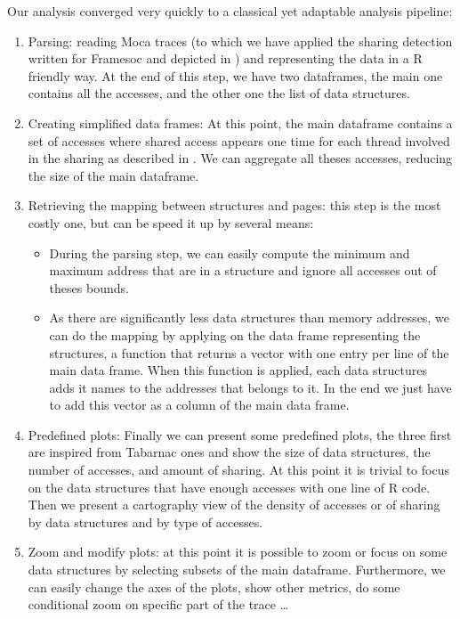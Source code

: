 Our analysis converged very quickly to a classical yet adaptable analysis pipeline:
\begin{enumerate}
    \item Parsing: reading \gls{Moca} traces (to which we have applied the sharing detection written for \gls{Framesoc} and depicted in )
        and representing the data in a \gls{R} friendly way.
        At the end of this step, we have two dataframes, the main one contains all the accesses, and the other one the list of data structures.
    \item Creating simplified data frames: At this point, the main dataframe contains a set of accesses where shared access appears one time for each thread involved in the sharing as described in .
        We can aggregate all theses accesses, reducing the size of the main dataframe.
    \item Retrieving the mapping between structures and pages: this step is the most costly one, but can be speed it up by several means:
        \begin{itemize}
            \item During the parsing step, we can easily compute the minimum and maximum address that are in a structure and ignore all accesses out of theses bounds.
            \item As there are significantly less data structures than memory addresses, we can do the mapping by applying on the data frame representing the structures, a function that returns a vector with one entry per line of the main data frame.
                When this function is applied, each data structures adds it names to the addresses that belongs to it.
                In the end we just have to add this vector as a column of the main data frame.
        \end{itemize}
    \item Predefined plots: Finally we can present some predefined  plots, the three first are inspired from \gls{Tabarnac} ones and show the size of data structures, the number of accesses, and amount of sharing.
        At this point it is trivial to focus on the data structures that have enough accesses with one line of \gls{R} code.
        Then we present a cartography view of the density of accesses or of sharing by data structures and by type of accesses.
    \item Zoom and modify plots: at this point it is possible to zoom or focus on some data structures by selecting subsets of the main dataframe.
        Furthermore, we can easily change the axes of the plots, show other metrics, do some conditional zoom on specific part of the trace \ldots
\end{enumerate}

